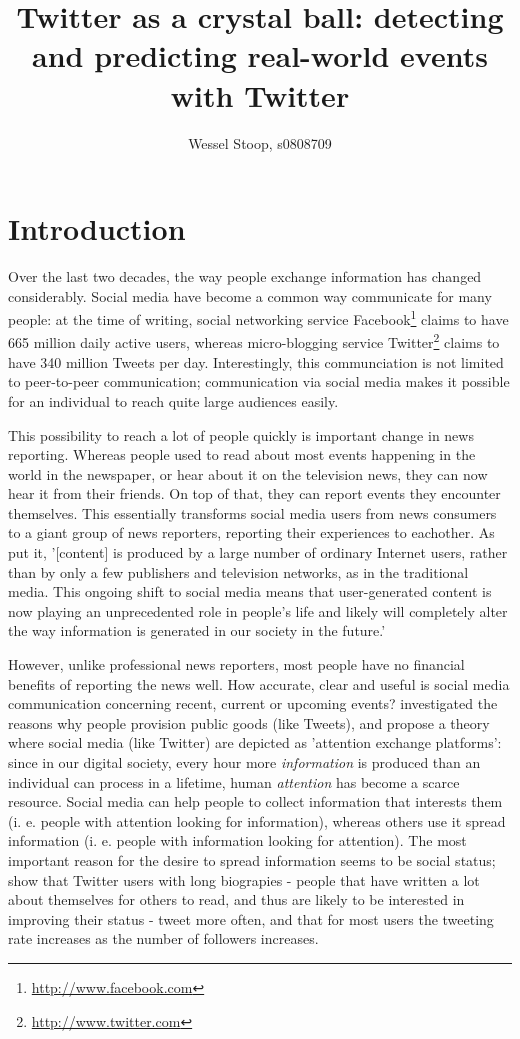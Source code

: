 \documentclass[12pt]{article}
\title{Twitter as a crystal ball: detecting and predicting real-world events with Twitter}
\author{Wessel Stoop, s0808709}
\begin{document}
\maketitle

\section{Introduction}
Over the last two decades, the way people exchange information has changed considerably. Social media have become a common way communicate for many people: at the time of writing, social networking service Facebook\footnote{\url{http://www.facebook.com}} claims to have 665 million daily active users, whereas micro-blogging service Twitter\footnote{\url{http://www.twitter.com}} claims to have 340 million Tweets per day. Interestingly, this communciation is not limited to peer-to-peer communication; communication via social media makes it possible for an individual to reach quite large audiences easily. 

This possibility to reach a lot of people quickly is important change in news reporting. Whereas people used to read about most events happening in the world in the newspaper, or hear about it on the television news, they can now hear it from their friends. On top of that, they can report events they encounter themselves. This essentially transforms social media users from news consumers to a giant group of news reporters, reporting their experiences to eachother. As  put it, '[content] is produced by a large number of ordinary Internet users, rather than by only a few publishers and television networks, as in the traditional media. This ongoing shift to social media means that user-generated content is now playing an unprecedented role in people’s life and likely will completely alter the way information is generated in our society in the future.'

However, unlike professional news reporters, most people have no financial benefits of reporting the news well. How accurate, clear and useful is social media communication concerning recent, current or upcoming events?  investigated the reasons why people provision public goods (like Tweets), and propose a theory where social media (like Twitter) are depicted as 'attention exchange platforms': since in our digital society, every hour more \emph{information} is produced than an individual can process in a lifetime, human \emph{attention} has become a scarce resource. Social media can help people to collect information that interests them (i. e. people with attention looking for information), whereas others use it spread information (i. e. people with information looking for attention). The most important reason for the desire to spread information seems to be social status;  show that Twitter users with long biograpies - people that have written a lot about themselves for others to read, and thus are likely to be interested in improving their status - tweet more often, and that for most users the tweeting rate increases as the number of followers increases.
\end{document}
